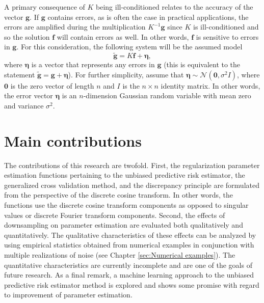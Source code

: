 \documentclass[12pt,notitlepage]{report}
\newcommand{\gVec}{\mathbf{g}}	%
\newcommand{\gnoiseVec}{\widetilde{\mathbf{g}}}	%
\newcommand{\kMat}{K}	%
\newcommand{\fVec}{\mathbf{f}}	%
\newcommand{\noise}{\eta}	%
\newcommand{\noiseSD}{\sigma}	%
\newcommand{\noiseVec}{\bm{\noise}}	%
\begin{document}
A primary consequence of $\kMat$ being ill-conditioned relates to the accuracy of the vector $\gVec$. If $\gVec$ contains errors, as is often the case in practical applications, the errors are amplified during the multiplication $\kMat^{-1}\gVec$ since $\kMat$ is ill-conditioned and so the solution $\fVec$ will contain errors as well. In other words, $\fVec$ is sensitive to errors in $\gVec$. For this consideration, the following system will be the assumed model
\begin{equation}
\gnoiseVec = \kMat\fVec + \noiseVec,
\label{eq:DisNoise}
\end{equation}
where $\noiseVec$ is a vector that represents any errors in $\gVec$ (this is equivalent to the statement $\gnoiseVec = \gVec + \noiseVec$). For further simplicity, assume that $\noiseVec \sim \mathcal{N}(\bm{0},\noiseSD^2I)$, where $\bm{0}$ is the zero vector of length $n$ and $I$ is the $n \times n$ identity matrix. In other words, the error vector $\noiseVec$ is an $n$-dimension Gaussian random variable with mean zero and variance $\noiseSD^2$. 

\section{Main contributions}
The contributions of this research are twofold. First, the regularization parameter estimation functions pertaining to the unbiased predictive risk estimator, the generalized cross validation method, and the discrepancy principle are formulated from the perspective of the discrete cosine transform. In other words, the functions use the discrete cosine transform components as opposed to singular values or discrete Fourier transform components. Second, the effects of downsampling on parameter estimation are evaluated both qualitatively and quantitatively. The qualitative characteristics of these effects can be analyzed by using empirical statistics obtained from numerical examples in conjunction with multiple realizations of noise (see Chapter \ref{sec:Numerical examples}). The quantitative characteristics are currently incomplete and are one of the goals of future research.  As a final remark, a machine learning approach to the unbiased predictive risk estimator method is explored and shows some promise with regard to improvement of parameter estimation.
\end{document}
